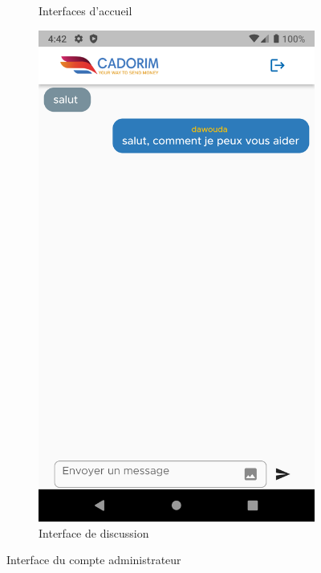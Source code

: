 \begin{itemize}[label=$\ast$]
\begin{figure}
\begin{subfigure}{0.3\textwidth}
	\caption{Interfaces d’accueil}
	\label{klk}
\end{subfigure}
\begin{subfigure}{0.3\textwidth}
	\includegraphics[width=\hsize, valign=m ]{./Template LaTeX/Images/From_emu/S_chatroom_res.png}
	\caption{Interface de discussion}
	\label{klk}
\end{subfigure}
	\caption{Interface du compte administrateur
}
\label{serviceCl}
\end{figure}
\end{itemize}


